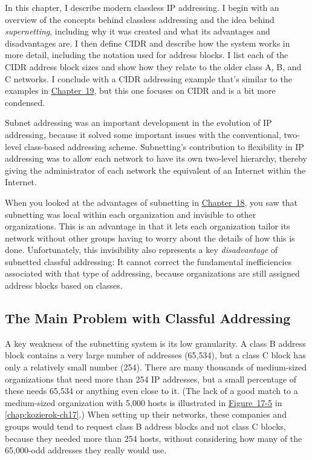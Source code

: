 \documentclass[b5paper,11pt]{memoir}
\begin{document}
In this chapter, I describe modern classless IP addressing. I begin with
an overview of the concepts behind classless addressing and the idea
behind {\emph{supernetting}}, including why it was created and what its
advantages and disadvantages are. I then define
\protect\hypertarget{ch20.htmlux5cux23idx-CHP-20-0758}{}{}CIDR and
describe how the system works in more detail, including the notation
used for address blocks. I list each of the CIDR address block sizes and
show how they relate to the older class A, B, and C networks. I conclude
with a CIDR addressing example that's similar to the examples in
\protect\hyperlink{ch19.html}{Chapter~19}, but this one focuses on CIDR
and is a bit more condensed.

Subnet addressing was an important development in the evolution of IP
addressing, because it solved some important issues with the
conventional, two-level class-based addressing scheme. Subnetting's
contribution to flexibility in IP addressing was to allow each network
to have its own two-level hierarchy, thereby giving the administrator of
each network the equivalent of an Internet within the Internet.

When you looked at the advantages of subnetting in
\protect\hyperlink{ch18.html}{Chapter~18}, you saw that subnetting was
local within each organization and invisible to other organizations.
This is an advantage in that it lets each organization tailor its
network without other groups having to worry about the details of how
this is done. Unfortunately, this invisibility also represents a key
{\emph{disadvantage}} of subnetted classful addressing: It cannot
correct the fundamental inefficiencies associated with that type of
addressing, because organizations are still assigned address blocks
based on classes.

\subsection[The Main Problem with Classful
Addressing]{\texorpdfstring{\protect\hypertarget{ch20.htmlux5cux23the_main_problem_with_classful_add-id001}{}{}The
Main Problem with Classful
Addressing}{The Main Problem with Classful Addressing}}

A key weakness of the subnetting system is its low
\protect\hypertarget{ch20.htmlux5cux23idx-CHP-20-0759}{}{}granularity. A
class B address block contains a very large number of addresses
(65,534), but a class C block has only a relatively small number (254).
There are many thousands of medium-sized organizations that need more
than 254 IP addresses, but a small percentage of these needs 65,534 or
anything even close to it. (The lack of a good match to a medium-sized
organization with 5,000 hosts is illustrated in
\protect\hyperlink{ch17s07.htmlux5cux23the_main_problem_with_classful_addressin}{Figure~17-5} in \vref{chap:kozierok-ch17}.)
When setting up their
networks, these companies and groups would tend to request class B
address blocks and not class C blocks, because they needed more than 254
hosts, without considering how many of the 65,000-odd addresses they
really would use.
\end{document}
